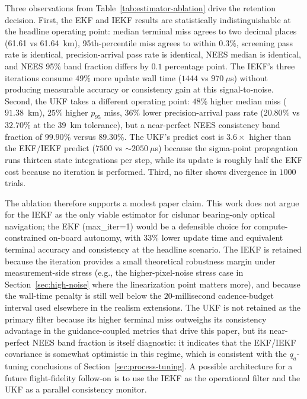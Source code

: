 \documentclass[10pt,twocolumn]{article}
\begin{document}
Three observations from Table~\ref{tab:estimator-ablation} drive the retention decision.  First, the EKF and IEKF results are statistically indistinguishable at the headline operating point: median terminal miss agrees to two decimal places (61.61 vs 61.64~km), 95th-percentile miss agrees to within $0.3\%$, screening pass rate is identical, precision-arrival pass rate is identical, NEES median is identical, and NEES 95\% band fraction differs by $0.1$ percentage point.  The IEKF's three iterations consume $49\%$ more update wall time ($1444$ vs $970~\mu$s) without producing measurable accuracy or consistency gain at this signal-to-noise.  Second, the UKF takes a different operating point: $48\%$ higher median miss ($91.38$~km), $25\%$ higher $p_{95}$ miss, $36\%$ lower precision-arrival pass rate ($20.80\%$ vs $32.70\%$ at the $39$~km tolerance), but a near-perfect NEES consistency band fraction of $99.90\%$ versus $89.30\%$.  The UKF's predict cost is $3.6\times$ higher than the EKF/IEKF predict ($7500$ vs $\sim 2050~\mu$s) because the sigma-point propagation runs thirteen state integrations per step, while its update is roughly half the EKF cost because no iteration is performed.  Third, no filter shows divergence in $1000$ trials.

The ablation therefore supports a modest paper claim.  This work does not argue for the IEKF as the only viable estimator for cislunar bearing-only optical navigation; the EKF (max\_iter=1) would be a defensible choice for compute-constrained on-board autonomy, with $33\%$ lower update time and equivalent terminal accuracy and consistency at the headline scenario.  The IEKF is retained because the iteration provides a small theoretical robustness margin under measurement-side stress (e.g., the higher-pixel-noise stress case in Section~\ref{sec:high-noise} where the linearization point matters more), and because the wall-time penalty is still well below the $20$-millisecond cadence-budget interval used elsewhere in the realism extensions.  The UKF is not retained as the primary filter because its higher terminal miss outweighs its consistency advantage in the guidance-coupled metrics that drive this paper, but its near-perfect NEES band fraction is itself diagnostic: it indicates that the EKF/IEKF covariance is somewhat optimistic in this regime, which is consistent with the $q_a$-tuning conclusions of Section~\ref{sec:process-tuning}.  A possible architecture for a future flight-fidelity follow-on is to use the IEKF as the operational filter and the UKF as a parallel consistency monitor.
\end{document}
